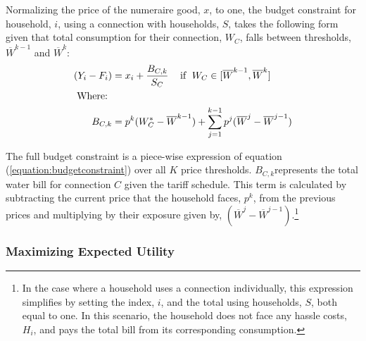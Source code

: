 \documentclass[12pt]{article}
\begin{document}
Normalizing the price of the numeraire good, $x$, to one, the budget constraint for household, $i$, using a connection with households, $S$, takes the following form given that total consumption for their connection, $W_C$, falls between thresholds, $\overline{W}^{k-1}$ and $\overline{W}^{k}$:
\begin{align}
\label{equation:budgetconstraint}
\begin{split}
(Y_i - F_i) &= x_i +   \dfrac{  B_{C,k}  }{S_C}    \hspace{.3cm} \text{ if } \hspace{.1cm} W_C \in [\overline{W}^{k-1},\overline{W}^{k}] \\
\text{Where: }& \\
B_{C,k}  &= p^{k} (W_{C}^{*} - \overline{W}^{k-1}) +\sum_{j=1}^{k-1}  p^{j}(\overline{W}^{j}-\overline{W}^{j-1}) 
\end{split}
\end{align}

The full budget constraint is a piece-wise expression of equation (\ref{equation:budgetconstraint}) over all $K$ price thresholds.  $B_{C,k}$represents the total water bill for connection $C$ given the tariff schedule.  This term is calculated by subtracting the current price that the household faces, $p^{k}$, from the previous prices and multiplying by their exposure given by, $(\overline{W}^{j}-\overline{W}^{j-1})$.\footnote{In the case where a household uses a connection individually, this expression simplifies by setting the index, $i$, and the total using households, $S$, both equal to one.  In this scenario, the household does not face any hassle costs, $H_i$, and pays the total bill from its corresponding consumption.}

\subsubsection{Maximizing Expected Utility}
\end{document}
